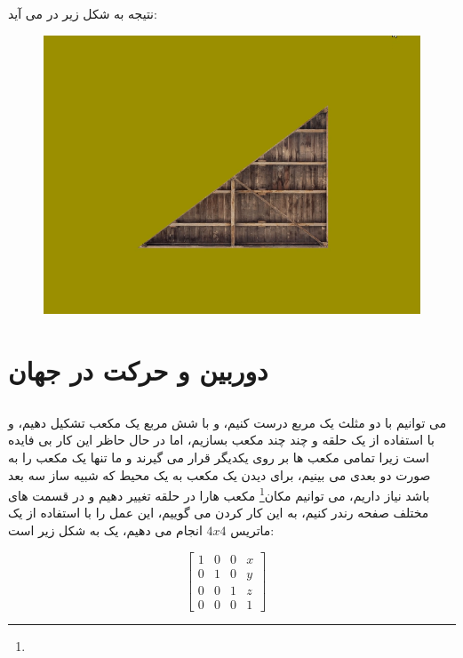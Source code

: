 \documentclass[a4paper, 12pt]{report}
\begin{document}
    نتیجه به شکل زیر در می آید:

\vspace*{0.3cm}
\begin{figure}[ht]
    \centering
    \href{https://github.com/devprofile98/shm}{
        \includegraphics[width=13cm]{images/texturedtriangle.png}
    }
    \caption{\fontsize{11pt}{1.0cm}\zarbold\textbf{}}
    \label{fig:my_label}
\end{figure}
\newpage



\section{\fontsize{15pt}{1.0cm}\zarbold\textbf{دوربین و حرکت در جهان}}
\vspace*{0.6cm}
\subsection{}
\noindent
\normalsize

    می توانیم با دو مثلث یک مربع درست کنیم، و با شش مربع یک مکعب تشکیل دهیم، و با استفاده از یک حلقه و چند  چند مکعب بسازیم، اما در حال حاظر این کار بی فایده است زیرا تمامی مکعب ها بر روی یکدیگر قرار می گیرند و ما تنها یک مکعب را به صورت دو بعدی می بینیم، برای دیدن یک مکعب به یک محیط که شبیه ساز سه بعد باشد نیاز داریم، می توانیم مکان\footnote{} مکعب هارا در حلقه تغییر دهیم و در قسمت های مختلف صفحه رندر کنیم، به این کار  کردن می گوییم، این عمل را با استفاده از یک ماتریس
    $4x4$
    انجام می دهیم، یک  به شکل زیر است:\par
\begin{center}
\setlength\arraycolsep{5pt}
\renewcommand{\arraystretch}{0.75}
	$$
	\begin{bmatrix}
	1 & 0 & 0 & x \\
	0 & 1 & 0 & y \\
	0 & 0 & 1 & z \\
    0 & 0 & 0 & 1
	\end{bmatrix}
	\quad
	$$
\end{center}
\end{document}

